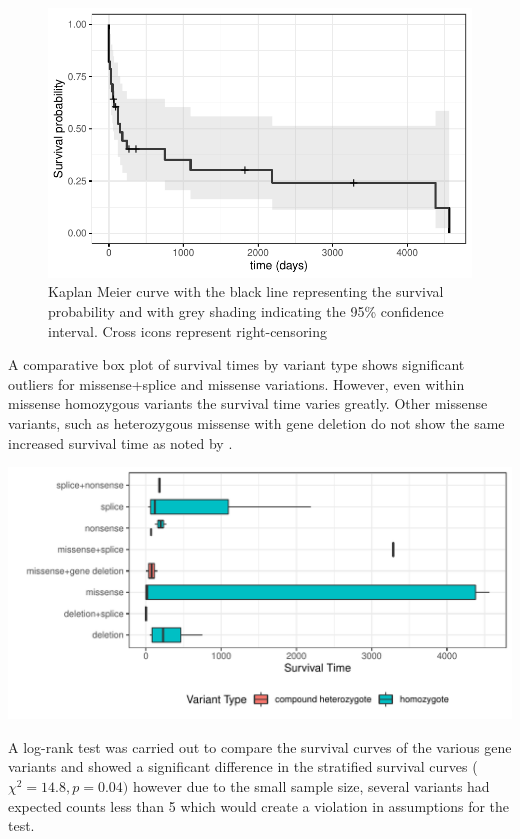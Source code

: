 \documentclass[
  authoryear,
  preprint,
  3p]{elsarticle}
\begin{document}
\begin{figure}

{\centering \includegraphics{paper_files/figure-pdf/fig-surv-1.pdf}

}

\caption{\label{fig-surv}Kaplan Meier curve with the black line
representing the survival probability and with grey shading indicating
the 95\% confidence interval. Cross icons represent right-censoring}

\end{figure}

A comparative box plot of survival times by variant type shows
significant outliers for missense+splice and missense variations.
However, even within missense homozygous variants the survival time
varies greatly. Other missense variants, such as heterozygous missense
with gene deletion do not show the same increased survival time as noted
by \citet{magini2019loss}.

\includegraphics{paper_files/figure-pdf/unnamed-chunk-14-1.pdf}

A log-rank test was carried out to compare the survival curves of the
various gene variants and showed a significant difference in the
stratified survival curves (\(\chi^2 = 14.8, p = 0.04)\) however due to
the small sample size, several variants had expected counts less than 5
which would create a violation in assumptions for the test.
\end{document}
